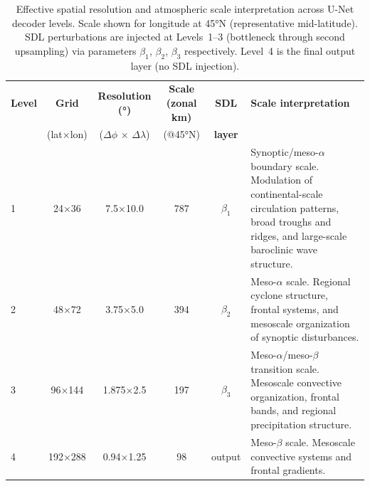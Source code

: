 \documentclass{agujournal2019}
\begin{document}
\begin{table}[h!]
\centering
\small
\begin{tabular}{lccccp{6.0cm}}
\toprule
\textbf{Level} & \textbf{Grid} & \textbf{Resolution (°)} & \textbf{Scale (zonal km)} & \textbf{SDL} & \textbf{Scale interpretation} \\
 & (lat×lon) & ($\Delta\phi$ × $\Delta\lambda$) & (@45°N) & \textbf{layer} & \\
\midrule
1 & 24×36   & 7.5×10.0  & 787 &
$\beta_1$ &
Synoptic/meso-$\alpha$ boundary scale. Modulation of continental-scale circulation patterns, broad troughs and ridges, and large-scale baroclinic wave structure. \\
2 & 48×72   & 3.75×5.0  & 394 &
$\beta_2$ &
Meso-$\alpha$ scale. Regional cyclone structure, frontal systems, and mesoscale organization of synoptic disturbances. \\
3 & 96×144  & 1.875×2.5 & 197 &
$\beta_3$ &
Meso-$\alpha$/meso-$\beta$ transition scale. Mesoscale convective organization, frontal bands, and regional precipitation structure. \\
4 & 192×288 & 0.94×1.25 & 98  &
output &
Meso-$\beta$ scale. Mesoscale convective systems and frontal gradients. \\
\bottomrule
\end{tabular}
\caption{Effective spatial resolution and atmospheric scale interpretation across U-Net decoder levels. Scale shown for longitude at 45°N (representative mid-latitude). SDL perturbations are injected at Levels~1--3 (bottleneck through second upsampling) via parameters $\beta_1$, $\beta_2$, $\beta_3$ respectively. Level~4 is the final output layer (no SDL injection).}
\label{tab:decoder_scales}
\end{table}
\end{document}
